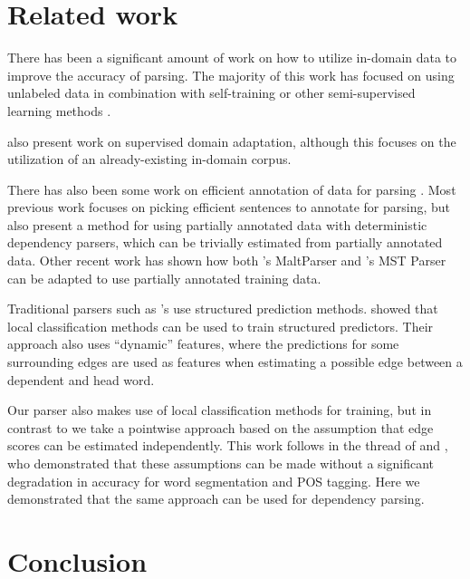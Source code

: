 \documentclass[english]{jnlp_1.4}
\begin{document}
\section{Related work}

There has been a significant amount of work on how to utilize in-domain data to improve the accuracy
of parsing. The majority of this work has focused on using unlabeled data in combination with
self-training \cite{roark03parseradaptation,mcclosky06reranking} or other semi-supervised learning
methods \cite{blitzer06structuralcorrespondence,nivre07conll,suzuki09ssparsing}.

 also present work on supervised domain adaptation, although this
focuses on the utilization of an already-existing in-domain corpus.

There has also been some work on efficient annotation of data for parsing
\cite{tang02alparsing,osborne04ensemble,sassano2010using}. Most previous work focuses on picking
efficient sentences to annotate for parsing, but  also present a method
for using partially annotated data with deterministic dependency parsers, which can be trivially
estimated from partially annotated data. Other recent work
\cite{spreyer2009incomplete,spreyer2010training} has shown how both 's
MaltParser and 's MST Parser can be adapted to use partially annotated training
data.

Traditional parsers such as 's use structured prediction methods.
 showed that local classification methods can be used to train structured
predictors. Their approach also uses ``dynamic'' features, where the predictions for some
surrounding edges are used as features when estimating a possible edge between a dependent and head
word.

Our parser also makes use of local classification methods for training, but in contrast to
 we take a pointwise approach based on the assumption that edge scores can
be estimated independently. This work follows in the thread of 
and , who demonstrated that these assumptions can be made without a
significant degradation in accuracy for word segmentation and POS
tagging. Here we demonstrated that the same approach can be used for dependency parsing.



\section{Conclusion}
\label{sec:conclusion}
\end{document}
